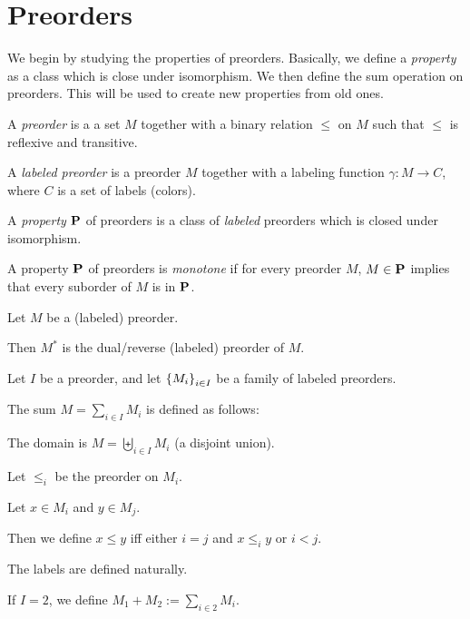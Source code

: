 \section{Preorders}

We begin by studying the properties of preorders.
Basically, we define a \emph{property} as a class which is
close under isomorphism. We then define
the sum operation on preorders. This will be used
to create new properties from old ones.

\begin{definitions}
  A \emph{preorder} is a a set $M$
  together with a binary relation $\le$ on $M$ such that
  $\le$ is reflexive and transitive.

  A \emph{labeled preorder} is a preorder $M$ together with a labeling function
  $\gamma : M \to C$, where $C$ is a set of labels (colors).
\end{definitions}

\begin{definition}
  A \emph{property} $\mathbf{P}$ of preorders is a class of \emph{labeled} preorders which
  is closed under isomorphism.
\end{definition}

\begin{definition}
  A property $\mathbf{P}$ of preorders is \emph{monotone} if for every preorder $M$,
  $M \in \mathbf{P}$ implies that every suborder of $M$ is in $\mathbf{P}$.
\end{definition}

\begin{definition}
  Let $M$ be a (labeled) preorder.

  Then $M^\ast$ is the dual/reverse (labeled) preorder of $M$.
\end{definition}

\begin{definition}
  Let $I$ be a preorder, and let $\left\{ {M_i} \right\}_{i \in I}$ be a family of labeled preorders.

  The sum $M = \sum_{i \in I} M_i$ is defined as follows:

  The domain is $M = \biguplus_{i \in I} M_i$ (a disjoint union).

  Let $\le_i$ be the preorder on $M_i$.

  Let $x \in M_i$ and $y \in M_j$.

  Then we define $x \le y$ iff either 
  $i = j$ and $x \le_i y$ or $i < j$.

  The labels are defined naturally.

  If $I = 2$, we define $M_1 + M_2 := \sum_{i \in 2} M_i$.
\end{definition}

